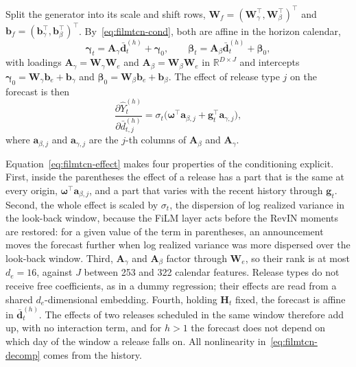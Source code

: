 Split the generator into its scale and shift rows,
$\mathbf{W}_f = (\mathbf{W}_\gamma^\top, \mathbf{W}_\beta^\top)^\top$ and
$\mathbf{b}_f = (\mathbf{b}_\gamma^\top, \mathbf{b}_\beta^\top)^\top$.
By~\eqref{eq:filmtcn-cond}, both are affine in the horizon calendar,
\begin{equation}
  \boldsymbol{\gamma}_t = \mathbf{A}_\gamma\bar{\mathbf{d}}^{(h)}_t
    + \boldsymbol{\gamma}_0,
  \qquad
  \boldsymbol{\beta}_t = \mathbf{A}_\beta\bar{\mathbf{d}}^{(h)}_t
    + \boldsymbol{\beta}_0,
  \label{eq:filmtcn-loadings}
\end{equation}
with loadings
$\mathbf{A}_\gamma = \mathbf{W}_\gamma\mathbf{W}_e$ and
$\mathbf{A}_\beta = \mathbf{W}_\beta\mathbf{W}_e$ in
$\mathbb{R}^{D\times J}$ and intercepts
$\boldsymbol{\gamma}_0 = \mathbf{W}_\gamma\mathbf{b}_e + \mathbf{b}_\gamma$
and $\boldsymbol{\beta}_0 = \mathbf{W}_\beta\mathbf{b}_e + \mathbf{b}_\beta$.
The effect of release type $j$ on the forecast is then
\begin{equation}
  \frac{\partial\hat{Y}^{(h)}_t}{\partial\bar{d}^{(h)}_{t,j}}
  = \sigma_t\bigl(\boldsymbol{\omega}^\top\mathbf{a}_{\beta,j}
    + \mathbf{g}_t^\top\mathbf{a}_{\gamma,j}\bigr),
  \label{eq:filmtcn-effect}
\end{equation}
where $\mathbf{a}_{\beta,j}$ and $\mathbf{a}_{\gamma,j}$ are the $j$-th columns
of $\mathbf{A}_\beta$ and $\mathbf{A}_\gamma$.

Equation~\eqref{eq:filmtcn-effect} makes four properties of the conditioning
explicit. First, inside the parentheses the effect of a release has a part that
is the same at every origin, $\boldsymbol{\omega}^\top\mathbf{a}_{\beta,j}$, and
a part that varies with the recent history through $\mathbf{g}_t$. Second, the
whole effect is scaled by $\sigma_t$, the dispersion of log realized variance in
the look-back window, because the FiLM layer acts before the RevIN moments are
restored: for a given value of the term in parentheses, an announcement moves
the forecast further when log realized variance was more dispersed over the
look-back window. Third, $\mathbf{A}_\gamma$ and $\mathbf{A}_\beta$ factor
through $\mathbf{W}_e$, so their rank is at most $d_e = 16$, against $J$
between 253 and 322 calendar features. Release types do not receive free
coefficients, as in a dummy regression; their effects are read from a shared
$d_e$-dimensional embedding. Fourth, holding $\mathbf{H}_t$ fixed, the forecast
is affine in $\bar{\mathbf{d}}^{(h)}_t$. The effects of two releases scheduled
in the same window therefore add up, with no interaction term, and for $h>1$
the forecast does not depend on which day of the window a release falls on. All nonlinearity
in~\eqref{eq:filmtcn-decomp} comes from the history.

